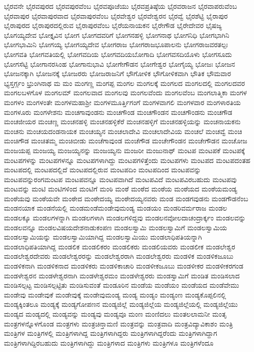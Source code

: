 {ಭೈರವನೇ
ಭೈರವಪುರದ
ಭೈರವಪುರವೆಂಬ
ಭೈರವಪೂಜೆಯು
ಭೈರವಪ್ರತಿಷ್ಠೆಯ
ಭೈರವರಾಜನ
ಭೈರವಾಪರುವೆಂಬ
ಭೈರವಾಪುರ
ಭೈರವಾಪುರವಾದ
ಭೈರವಾಪುರವೆಂಬ
ಭೈರವೇಶ್ವರ
ಭೈರವೇಶ್ವರನ
ಭೈರವ್ವೆ
ಭೈರಶೆಟ್ಟಿ
ಭೈರಾಪುರ
ಭೈರಾಪುರದ
ಭೈರಾಪುರದಲ್ಲಿರುವ
ಭೈರಾಪುರವೆಂಬ
ಭೈರೆಯನಾಯಕನ
ಭೈರೇಗೌಡ
ಭೈರೇದೇವರ
ಭೈಷಜ್ಯ
ಭೊಗಯ್ಯದೇವ
ಭೋಕ್ತೃವಿನ
ಭೋಗ
ಭೋಗದವರಿಗೆ
ಭೋಗನಹಳ್ಳಿ
ಭೋಗನಾಥ
ಭೋಗನಿಧಿ
ಭೋಗಭಾಗಿನಿ
ಭೋಗಭಾಮಿನಿ
ಭೋಗಯ್ಯ
ಭೋಗಯ್ಯದೇವ
ಭೋಗರಾಜ
ಭೋಗರಾಜಭೂಪಾಲನು
ಭೋಗರಾಜವರತಲ್ಪಃ
ಭೋಗವತಿ
ಭೋಗವತಿಯಲ್ಲಿ
ಭೋಗವದಿಯ
ಭೋಗವದಿಯಬೋಗಾದಿ
ಭೋಗವಸದಿಯೊಳು
ಭೋಗಸೂದು
ಭೋಗಸೆಟ್ಟಿ
ಭೋಗಾನರಸಿಂಹ
ಭೋಗಾನುಭಾವಿ
ಭೋಗೇಗೌಡನ
ಭೋಗೇಶ್ವರ
ಭೋಗೈಯ್ಯ
ಭೋಜಃ
ಭೋಜನ
ಭೋಜನಕ್ಕಾಗಿ
ಭೋಜನಕ್ಕೆ
ಭೋಜರರು
ಭೋಜರಾಜನಿಗೆ
ಭೌಗೋಳಿಕ
ಭೌಗೋಳಿಕವಾಗಿ
ಭೌತಿಕ
ಭೌಮವಾರ
ಭ್ಯಸ್ತರ್ಗ್ಗಂ
ಭ್ರುಂಗಿನಾಥ
ಮ
ಮಂ
ಮಂಗಣ್ಣ
ಮಂಗಪ್ಪ
ಮಂಗಲ
ಮಂಗಲಕ್ಕೆ
ಮಂಗಲದ
ಮಂಗಲದಲ್ಲಿ
ಮಂಗಲದವರ
ಮಂಗಲಬಳಗೊಳ
ಮಂಗಲಮ್
ಮಂಗಲವಾದ
ಮಂಗಲವು
ಮಂಗಲವೆಂದು
ಮಂಗಲವೆಂಬ
ಮಂಗಲಾತ್ಮಿಕಾ
ಮಂಗಳ
ಮಂಗಳಂ
ಮಂಗಳಂತೇ
ಮಂಗಳಮಹಾಶ್ರೀ
ಮಂಗಳಮೂರ್ತ್ತಿಗಂಗೆ
ಮಂಗಳವಾಗಲಿ
ಮಂಗಳವಾರ
ಮಂಗಳಾರತಿಯ
ಮಂಗಳೂರು
ಮಂಗಳೇಶನು
ಮಂಚಗಾವುಂಡನು
ಮಂಚಗೌಂಡ
ಮಂಚಗೌಂಡನ
ಮಂಚಗೌಂಡನು
ಮಂಚಗೌಡ
ಮಂಚಜೀಯರ
ಮಂಚಣ್ಣ
ಮಂಚನಹಳ್ಳಿ
ಮಂಚನಹಳ್ಳಿಕೆರೆ
ಮಂಚನಹಳ್ಳಿಗೆ
ಮಂಚನಹಳ್ಳಿಯನ್ನು
ಮಂಚನಾಯಕನು
ಮಂಚನು
ಮಂಚಯದಂಡನಾಯಕ
ಮಂಚಯ್ಯನ
ಮಂಚಲಾದೇವಿ
ಮಂಚಲಾದೇವಿಯ
ಮಂಚಲೆ
ಮಂಚವ್ವೆ
ಮಂಚಿ
ಮಂಚಿಗೌಡ
ಮಂಚಿತಮ್ಮ
ಮಂಚಿಬೀಡು
ಮಂಚೆಗಾವುಂಡ
ಮಂಚೆಗೌಡ
ಮಂಚೇಗೌಂಡನ
ಮಂಚೇಗೌಡನ
ಮಂಚೋಜ
ಮಂಜಯಪ್ಪ
ಮಂಜಯ್ಯ
ಮಂಜಯ್ಯನನ್ನು
ಮಂಜಯ್ಯನು
ಮಂಜರೀ
ಮಂಜುನಾಥ್
ಮಂಟಪ
ಮಂಟಪಕೆ
ಮಂಟಪಕ್ಕೆ
ಮಂಟಪಗಳನ್ನು
ಮಂಟಪಗಳನ್ನೂ
ಮಂಟಪಗಳಾಗಿದ್ದು
ಮಂಟಪಗಳಿತ್ತೆಂದು
ಮಂಟಪಗಳು
ಮಂಟಪದ
ಮಂಟಪದಂತಹ
ಮಂಟಪದಲ್ಲಿ
ಮಂಟಪದಲ್ಲಿದೆ
ಮಂಟಪದಲ್ಲಿರುವ
ಮಂಟಪದಿಂ
ಮಂಟಪದಿಂದ
ಮಂಟಪವನ್ನು
ಮಂಟಪವನ್ನುರಂಗಮಂಟಪ
ಮಂಟಪವನ್ನೂ
ಮಂಟಪವಾಗಿದೆ
ಮಂಟಪವಿದೆ
ಮಂಟಪವಿರಬಹುದು
ಮಂಟಪವು
ಮಂಟವನ್ನು
ಮಂಟಿ
ಮಂಟಿಗಳಿಂದ
ಮಂಟಿಗೆ
ಮಂಠಿ
ಮಂಠೆ
ಮಂಠೆದ
ಮಂಠೆಯ
ಮಂಠೆಯದ
ಮಂಠೆಯಮಂಡ್ಯ
ಮಂಠೆಯವು
ಮಂಠೆಯವೇ
ಮಂಠೇದ
ಮಂಠೇದಯ್ಯ
ಮಂಠೇದಯ್ಯನವರು
ಮಂಡ
ಮಂಡಗವುಡನು
ಮಂಡಗೌಡನೆಂಬ
ಮಂಡನಯಾಕ
ಮಂಡನೆಯಲ್ಲಿ
ಮಂಡಮಂಡೆಮಂಡೇವುಮಂಡ್ಯ
ಮಂಡಯಂ
ಮಂಡರಿವರ್ಮರಾಜ
ಮಂಡಲ
ಮಂಡಲಕ್ಕೂ
ಮಂಡಲಗಳನ್ನಾಗಿ
ಮಂಡಲಗಳಾಗಿ
ಮಂಡಲಗಳಿದ್ದವು
ಮಂಡಲನವೋಲದಾಚಂದ್ರಾರ್ಕ್ಕಂ
ಮಂಡಲವನ್ನು
ಮಂಡಲವನ್ನೂ
ಮಂಡಲವಿಷಯದೇಶನಾಡುಕಂಪಣ
ಮಂಡಲಸ್ವಾಮಿ
ಮಂಡಲಸ್ವಾಮಿಗೆ
ಮಂಡಲಸ್ವಾಮಿಯ
ಮಂಡಲಸ್ವಾಮಿಯನ್ನು
ಮಂಡಲಸ್ವಾಮಿಯಾಗಿದ್ದ
ಮಂಡಲಸ್ವಾಮಿಯು
ಮಂಡಲಾಧಿಪತಿಯನ್ನಾಗಿ
ಮಂಡಲಾಧಿಪತಿಯಾಗಿದ್ದ
ಮಂಡಲಿಕ
ಮಂಡಲಿಕರಂ
ಮಂಡಲಿಕರು
ಮಂಡಲಿಯವರು
ಮಂಡಲೀಕ
ಮಂಡಲೇಶ್ವರ
ಮಂಡಲೇಶ್ವರದೇವರು
ಮಂಡಲೇಶ್ವರರನ್ನು
ಮಂಡಲೇಶ್ವರರಾಗಿ
ಮಂಡಲೇಶ್ವರರು
ಮಂಡಳಿಕ
ಮಂಡಳಿಕಜೂಬು
ಮಂಡಳಿಕನಾಗಿ
ಮಂಡಳಿಕನಾದ
ಮಂಡಳಿಕರು
ಮಂಡಳಿಕಾಚಾರಿ
ಮಂಡಳೀಕಜೂಬು
ಮಂಡಳೀಕರ
ಮಂಡಳೀಕರಗಂಡ
ಮಂಡಳೇಶ್ವರನ
ಮಂಡಳೇಶ್ವರನಾಗಿ
ಮಂಡಳೇಶ್ವರಮಂ
ಮಂಡಳೇಶ್ವರರು
ಮಂಡಸ್ವಾಮಿಗೆ
ಮಂಡಿತ
ಮಂಡಿಸಲಾದ
ಮಂಡಿಸಲ್ಪಟ್ಟ
ಮಂಡಿಸಲ್ಪಟ್ಟಿತು
ಮಂಡಿಸುವಂತೆ
ಮಂಡೂರಿನ
ಮಂಡೆಯ
ಮಂಡೆಯಂ
ಮಂಡೆಯದ
ಮಂಡೆವೇಮು
ಮಂಡೇವು
ಮಂಡೇವುಕೆ
ಮಂಡೇವುಕ್ಕೆ
ಮಂಡೇವುಮಂಡ್ಯ
ಮಂಡ್ಯ
ಮಂಡ್ಯಂ
ಮಂಡ್ಯಂಣ
ಮಂಡ್ಯಕೊಪ್ಪಲಿನಲ್ಲಿ
ಮಂಡ್ಯಕ್ಕಿಂತಲೂ
ಮಂಡ್ಯಕ್ಕೆ
ಮಂಡ್ಯಗೋಪಣನ
ಮಂಡ್ಯಜಿಲ್ಲೆ
ಮಂಡ್ಯಜಿಲ್ಲೆಯ
ಮಂಡ್ಯಜಿಲ್ಲೆಯಲ್ಲಿ
ಮಂಡ್ಯಜಿಲ್ಲೆಯು
ಮಂಡ್ಯದ
ಮಂಡ್ಯದಲ್ಲಿ
ಮಂಡ್ಯವನ್ನು
ಮಂಡ್ಯವು
ಮಂಡ್ಯವೂ
ಮಂಣ
ಮಂಣಿದಲು
ಮಂತಲಲಾಮನೀ
ಮಂತೃ
ಮಂತ್ರಗಳನ್ನೊಳಗೊಂಡ
ಮಂತ್ರಗಳು
ಮಂತ್ರಚಿನ್ತಾಮಣಿ
ಮಂತ್ರವನ್ನು
ಮಂತ್ರವಾದಿ
ಮಂತ್ರವಿದ್ಯಾವಿಕಾಶಂ
ಮಂತ್ರಿ
ಮಂತ್ರಿಗಳ
ಮಂತ್ರಿಗಳಲ್ಲಿ
ಮಂತ್ರಿಗಳಾಗಿದ್ದ
ಮಂತ್ರಿಗಳಾಗಿದ್ದರು
ಮಂತ್ರಿಗಳಾಗಿದ್ದರೆಂದು
ಮಂತ್ರಿಗಳಾಗಿದ್ದಾಗ
ಮಂತ್ರಿಗಳಾಗಿದ್ದಿರಬಹುದು
ಮಂತ್ರಿಗಳಾಗಿದ್ದು
ಮಂತ್ರಿಗಳಾದ
ಮಂತ್ರಿಗಳು
ಮಂತ್ರಿಗಳೂ
ಮಂತ್ರಿಗಳೆಂದೂ
}

